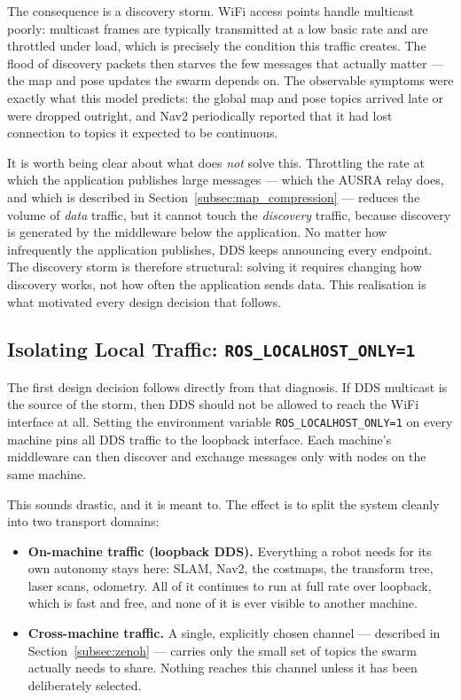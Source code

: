 The consequence is a discovery storm. WiFi access points handle multicast poorly: multicast frames are typically transmitted at a low basic rate and are throttled under load, which is precisely the condition this traffic creates. The flood of discovery packets then starves the few messages that actually matter --- the map and pose updates the swarm depends on. The observable symptoms were exactly what this model predicts: the global map and pose topics arrived late or were dropped outright, and Nav2 periodically reported that it had lost connection to topics it expected to be continuous.

It is worth being clear about what does \emph{not} solve this. Throttling the rate at which the application publishes large messages --- which the AUSRA relay does, and which is described in Section~\ref{subsec:map_compression} --- reduces the volume of \emph{data} traffic, but it cannot touch the \emph{discovery} traffic, because discovery is generated by the middleware below the application. No matter how infrequently the application publishes, DDS keeps announcing every endpoint. The discovery storm is therefore structural: solving it requires changing how discovery works, not how often the application sends data. This realisation is what motivated every design decision that follows.

\subsection{Isolating Local Traffic: \texttt{ROS\_LOCALHOST\_ONLY=1}}
\label{subsec:localhost_only}

The first design decision follows directly from that diagnosis. If DDS multicast is the source of the storm, then DDS should not be allowed to reach the WiFi interface at all. Setting the environment variable \texttt{ROS\_LOCALHOST\_ONLY=1} on every machine pins all DDS traffic to the loopback interface. Each machine's middleware can then discover and exchange messages only with nodes on the same machine.

This sounds drastic, and it is meant to. The effect is to split the system cleanly into two transport domains:

\begin{itemize}
    \item \textbf{On-machine traffic (loopback DDS).} Everything a robot needs for its own autonomy stays here: SLAM, Nav2, the costmaps, the transform tree, laser scans, odometry. All of it continues to run at full rate over loopback, which is fast and free, and none of it is ever visible to another machine.
    \item \textbf{Cross-machine traffic.} A single, explicitly chosen channel --- described in Section~\ref{subsec:zenoh} --- carries only the small set of topics the swarm actually needs to share. Nothing reaches this channel unless it has been deliberately selected.
\end{itemize}

